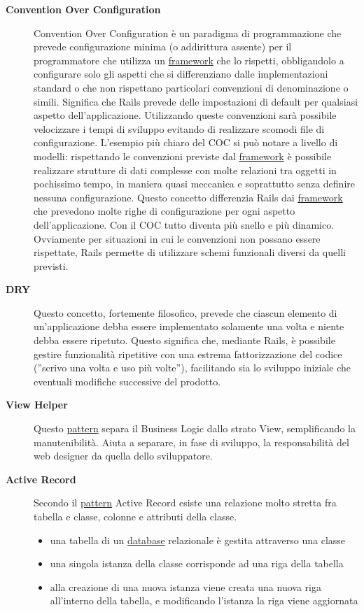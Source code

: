 \documentclass[11pt,a4paper]{article}
\begin{document}
\begin{description}
\item[\textbf{Convention Over Configuration}]
Convention Over Configuration è un paradigma di programmazione che prevede configurazione minima (o addirittura assente) per il programmatore che utilizza un \underline{framework} che lo rispetti, obbligandolo a configurare solo gli aspetti che si differenziano dalle implementazioni standard o che non rispettano particolari convenzioni di denominazione o simili.
Significa che Rails prevede delle impostazioni di default per qualsiasi aspetto dell’applicazione. Utilizzando queste convenzioni sarà possibile velocizzare i tempi di sviluppo evitando di realizzare scomodi file di configurazione. L’esempio più chiaro del COC si può notare a livello di modelli: rispettando le convenzioni previste dal \underline{framework} è possibile realizzare strutture di dati complesse con molte relazioni tra oggetti in pochissimo tempo, in maniera quasi meccanica e soprattutto senza definire nessuna configurazione. Questo concetto differenzia Rails dai \underline{framework} che prevedono molte righe di configurazione per ogni aspetto dell’applicazione. Con il COC tutto diventa più snello e più dinamico. Ovviamente per situazioni in cui le convenzioni non possano essere rispettate, Rails permette di utilizzare schemi funzionali diversi da quelli previsti.
\item[\textbf{DRY}]
Questo concetto, fortemente filosofico, prevede che ciascun elemento di un’applicazione debba essere implementato solamente una volta e niente debba essere ripetuto. Questo significa che, mediante Rails, è possibile gestire funzionalità ripetitive con una estrema fattorizzazione del codice (''scrivo una volta e uso più volte''), facilitando sia lo sviluppo iniziale che eventuali modifiche successive del prodotto.
\item[\textbf{View Helper}]
Questo \underline{pattern} separa il Business Logic dallo strato View, semplificando
la manutenibilità. Aiuta a separare, in fase di sviluppo, la responsabilità
del web designer da quella dello sviluppatore.
\item[\textbf{Active Record}]
Secondo il \underline{pattern} Active Record esiste una relazione molto stretta fra tabella e classe, colonne e attributi della classe.
\begin{itemize}
 \item una tabella di un \underline{database} relazionale è gestita attraverso una classe
\item una singola istanza della classe corrisponde ad una riga della tabella
\item alla creazione di una nuova istanza viene creata una nuova riga all'interno della tabella, e modificando l'istanza la riga viene aggiornata
\end{itemize}
\end{description}
\end{document}
